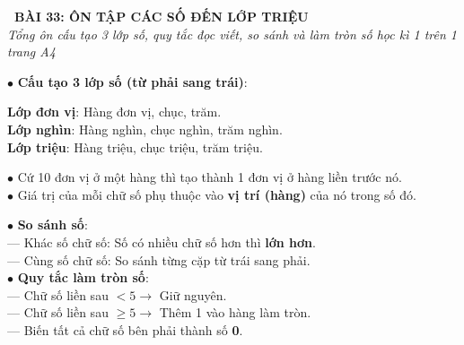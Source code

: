 \documentclass[14pt,a4paper,oneside]{extbook}
\begin{document}
\noindent
\begin{tcolorbox}[
  enhanced,
  colback=teal!8!white,
  colframe=teal!80!black,
  arc=3mm, boxrule=1pt,
  left=3mm, right=3mm, top=2mm, bottom=2mm,
  halign=center
]
  {\Large\bfseries\color{teal!90!black}\faBookmark\ BÀI 33: ÔN TẬP CÁC SỐ ĐẾN LỚP TRIỆU}\\[1.5pt]
  {\footnotesize\itshape\color{black!75} Tổng ôn cấu tạo 3 lớp số, quy tắc đọc viết, so sánh và làm tròn số học kì 1 trên 1 trang A4}
\end{tcolorbox}

\vspace{2mm}

\noindent
\begin{minipage}[t]{0.49\textwidth}
  \begin{tcolorbox}[
    enhanced,
    title={\footnotesize\bfseries\color{white}\faCube\ 1. Ba lớp số \& Giá trị theo hàng},
    colback=blue!2!white,
    colframe=blue!75!black,
    arc=2.5mm, boxrule=0.8pt, top=1.8mm, bottom=1.8mm, left=2mm, right=2mm
  ]
    \footnotesize
    $\bullet$ \textbf{Cấu tạo 3 lớp số (từ phải sang trái)}:
    \begin{center}
      \textbf{Lớp đơn vị}: Hàng đơn vị, chục, trăm.\\
      \textbf{Lớp nghìn}: Hàng nghìn, chục nghìn, trăm nghìn.\\
      \textbf{Lớp triệu}: Hàng triệu, chục triệu, trăm triệu.
    \end{center}
    $\bullet$ Cứ 10 đơn vị ở một hàng thì tạo thành 1 đơn vị ở hàng liền trước nó.\\
    $\bullet$ Giá trị của mỗi chữ số phụ thuộc vào \textbf{vị trí (hàng)} của nó trong số đó.
  \end{tcolorbox}
\end{minipage}%
\hfill
\begin{minipage}[t]{0.49\textwidth}
  \begin{tcolorbox}[
    enhanced,
    title={\footnotesize\bfseries\color{white}\faSliders\ 2. So sánh và làm tròn số},
    colback=teal!2!white,
    colframe=teal!75!black,
    arc=2.5mm, boxrule=0.8pt, top=1.8mm, bottom=1.8mm, left=2mm, right=2mm
  ]
    \footnotesize
    $\bullet$ \textbf{So sánh số}:\\
    --- Khác số chữ số: Số có nhiều chữ số hơn thì \textbf{lớn hơn}.\\
    --- Cùng số chữ số: So sánh từng cặp từ trái sang phải.\\
    $\bullet$ \textbf{Quy tắc làm tròn số}:\\
    --- Chữ số liền sau $< 5 \rightarrow$ Giữ nguyên.\\
    --- Chữ số liền sau $\ge 5 \rightarrow$ Thêm 1 vào hàng làm tròn.\\
    --- Biến tất cả chữ số bên phải thành số \textbf{0}.
  \end{tcolorbox}
\end{minipage}
\end{document}
